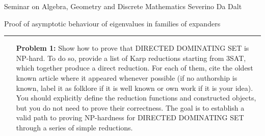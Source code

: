 \documentclass{amsart}
\theoremstyle{plain}
\begin{document}
{\Large Seminar on Algebra, Geometry and Discrete Mathematics \hspace*{10.5em} Severino Da Dalt}






{\Large Proof of asymptotic behaviour of eigenvalues in families of expanders}

\vspace{0.5cm}

 \hrule

\vspace{0.5cm}

\begin{enumerate}
\item[\textbf{Problem 1:}] Show how to prove that DIRECTED DOMINATING SET is NP-hard.
To do so, provide a list of Karp reductions starting from 3SAT, which together produce a direct reduction.
For each of them, cite the oldest known article where it appeared whenever possible (if no authorship is known, label it as folklore if it is well known or own work if it is your idea).
You should explicitly define the reduction functions and constructed objects, but you do not need to prove their correctness.
The goal is to establish a valid path to proving NP-hardness for DIRECTED DOMINATING SET through a series of simple reductions.
\end{enumerate}
\end{document}
